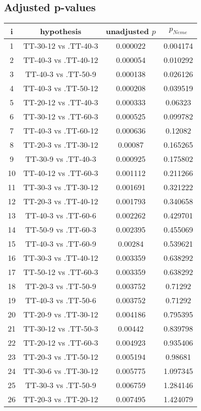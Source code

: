 \documentclass[a4paper,10pt]{article}
\begin{document}
\begin{landscape}
\pagebreak

\subsection{Adjusted p-values}

\begin{table}[!htp]
\centering\scriptsize
\begin{tabular}{cccc}
i&hypothesis&unadjusted $p$&$p_{Neme}$\\
\hline1&TT-30-12 vs .TT-40-3&0.000022&0.004174\\
2&TT-40-3 vs .TT-40-12&0.000054&0.010292\\
3&TT-40-3 vs .TT-50-9&0.000138&0.026126\\
4&TT-40-3 vs .TT-50-12&0.000208&0.039519\\
5&TT-20-12 vs .TT-40-3&0.000333&0.06323\\
6&TT-30-12 vs .TT-60-3&0.000525&0.099782\\
7&TT-40-3 vs .TT-60-12&0.000636&0.12082\\
8&TT-20-3 vs .TT-30-12&0.00087&0.165265\\
9&TT-30-9 vs .TT-40-3&0.000925&0.175802\\
10&TT-40-12 vs .TT-60-3&0.001112&0.211266\\
11&TT-30-3 vs .TT-30-12&0.001691&0.321222\\
12&TT-20-3 vs .TT-40-12&0.001793&0.340658\\
13&TT-40-3 vs .TT-60-6&0.002262&0.429701\\
14&TT-50-9 vs .TT-60-3&0.002395&0.455069\\
15&TT-40-3 vs .TT-60-9&0.00284&0.539621\\
16&TT-30-3 vs .TT-40-12&0.003359&0.638292\\
17&TT-50-12 vs .TT-60-3&0.003359&0.638292\\
18&TT-20-3 vs .TT-50-9&0.003752&0.71292\\
19&TT-40-3 vs .TT-50-6&0.003752&0.71292\\
20&TT-20-9 vs .TT-30-12&0.004186&0.795395\\
21&TT-30-12 vs .TT-50-3&0.00442&0.839798\\
22&TT-20-12 vs .TT-60-3&0.004923&0.935406\\
23&TT-20-3 vs .TT-50-12&0.005194&0.98681\\
24&TT-30-6 vs .TT-30-12&0.005775&1.097345\\
25&TT-30-3 vs .TT-50-9&0.006759&1.284146\\
26&TT-20-3 vs .TT-20-12&0.007495&1.424079\\

\end{tabular}
\end{table}
\end{landscape}
\end{document}
